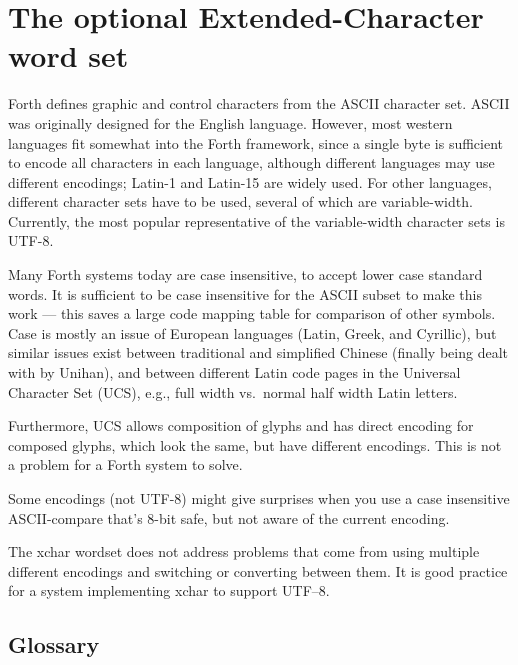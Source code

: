 

\section{The optional Extended-Character word set} %
\label{rat:xchar}

Forth defines graphic and control characters from the ASCII character
set.  ASCII was originally designed for the English language.
However, most western languages fit somewhat into the Forth framework,
since a single byte is sufficient to encode all characters in each
language, although different languages may use different encodings;
Latin-1 and Latin-15 are widely used.  For other languages, different
character sets have to be used, several of which are variable-width.
Currently, the most popular representative of the variable-width
character sets is UTF-8.

Many Forth systems today are case insensitive, to accept lower case
standard words.  It is sufficient to be case insensitive for the ASCII
subset to make this work --- this saves a large code mapping table for
comparison of other symbols.  Case is mostly an issue of European
languages (Latin, Greek, and Cyrillic), but similar issues exist
between traditional and simplified Chinese (finally being dealt with
by Unihan), and between different Latin code pages in the Universal
Character Set (UCS), e.g., full width vs.\ normal half width Latin
letters.

Furthermore, UCS allows composition of glyphs and has direct encoding for
composed glyphs, which look the same, but have different encodings.  This
is not a problem for a Forth system to solve.

Some encodings (not UTF-8) might give surprises when you use a case
insensitive ASCII-compare that's 8-bit safe, but not aware of the
current encoding.

The xchar wordset does not address problems that come from using
multiple different encodings and switching or converting between them.
It is good practice for a system implementing xchar to support UTF--8.

\setcounter{subsection}{5}
\subsection{Glossary} %


\endinput
